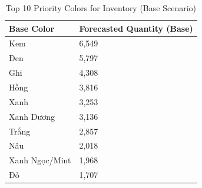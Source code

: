 \begin{table}[htbp]
\centering
\caption{Top 10 Priority Colors for Inventory (Base Scenario)}
\label{tab:color_top10}
\begin{tabular}{ll}
\toprule
\textbf{Base Color} & \textbf{Forecasted Quantity (Base)} \\
\midrule
Kem & 6,549 \\
Đen & 5,797 \\
Ghi & 4,308 \\
Hồng & 3,816 \\
Xanh & 3,253 \\
Xanh Dương & 3,136 \\
Trắng & 2,857 \\
Nâu & 2,018 \\
Xanh Ngọc/Mint & 1,968 \\
Đỏ & 1,707 \\
\bottomrule
\end{tabular}
\end{table}
